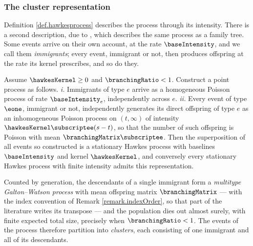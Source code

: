 \subsubsection{The cluster representation}
\label{sec.clusterRepresentation}

Definition \ref{def.hawkesprocess} describes the process through its intensity.
There is a second description, due to \cite{HO74clu},
which describes the same process as a family tree.
Some events arrive on their own account, at the rate $\baseIntensity$,
and we call them \emph{immigrants};
every event, immigrant or not, then produces offspring at the rate its kernel prescribes,
and so do they.

\begin{prop}\label{prop.clusterRepresentation}
 Assume $\hawkesKernel \geq 0$ and $\branchingRatio < 1$.
 Construct a point process as follows.
 \emph{i.} Immigrants of type $e$ arrive as a homogeneous Poisson process of rate
 $\baseIntensity_e$, independently across $e$.
 \emph{ii.} Every event of type $\eone$, immigrant or not,
 independently generates its direct offspring of type $e$
 as an inhomogeneous Poisson process on $(t,\infty)$ of intensity $\hawkesKernel\subscriptee(s-t)$,
 so that the number of such offspring is Poisson with mean $\branchingMatrix\subscriptee$.
 Then the superposition of all events so constructed is a stationary Hawkes process
 with baselines $\baseIntensity$ and kernel $\hawkesKernel$,
 and conversely every stationary Hawkes process with finite intensity admits this representation.
\end{prop}

Counted by generation, the descendants of a single immigrant form a
\emph{multitype Galton--Watson process} with mean offspring matrix $\branchingMatrix$
--- with the index convention of Remark \ref{remark.indexOrder},
so that part of the literature writes its transpose ---
and the population dies out almost surely, with finite expected total size,
precisely when $\branchingRatio < 1$.
The events of the process therefore partition into \emph{clusters},
each consisting of one immigrant and all of its descendants.
